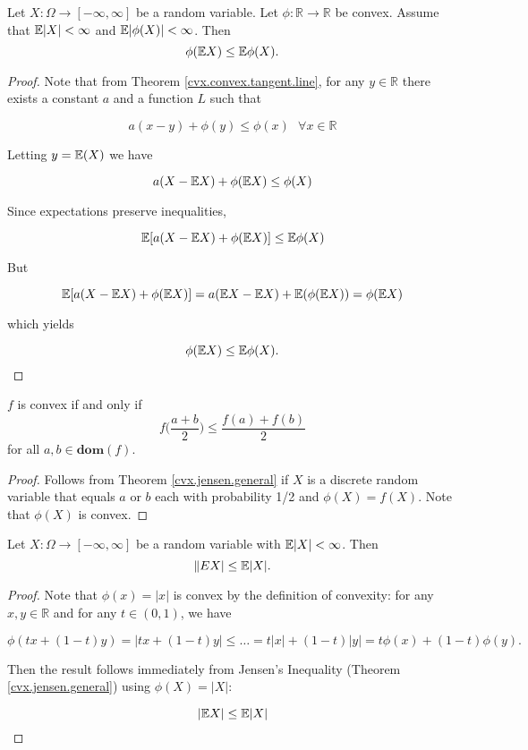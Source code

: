 \begin{theorem}\label{cvx.jensen.general}Let $X:\Omega\to[-\infty,\infty]$ be a random variable.  Let $\phi:\mathbb{R}\to\mathbb{R}$ be convex.  Assume that $\mathbb{E}|X|<\infty$ and $\mathbb{E}|\phi(X)|<\infty$.  Then
$$\phi(\mathbb{E} X)\leq \mathbb{E} \phi(X).$$
\end{theorem}

\begin{proof}Note that from Theorem \ref{cvx.convex.tangent.line}, for any \(y \in \mathbb{R}\) there exists a constant \(a\) and a function \(L\) such that

\[
a(x-y)+\phi(y) \leq \phi(x) \ \ \ \forall x \in \mathbb{R}
\]

Letting \(y = \mathbb{E}(X)\) we have

\[
a (X-\mathbb{E} X)+\phi(\mathbb{E} X) \leq \phi(X)
\]

Since expectations preserve inequalities,

\[
\mathbb{E}[a (X-\mathbb{E} X)+\phi(\mathbb{E} X)] \leq \mathbb{E} \phi(X)
\]

But

\[
\mathbb{E}[a(X-\mathbb{E} X)+\phi(\mathbb{E} X)]  = a(\mathbb{E} X - \mathbb{E} X) + \mathbb{E}(\phi(\mathbb{E} X)) = \phi(\mathbb{E} X)
\]

which yields

\[
\phi( \mathbb{E} X) \leq \mathbb{E} \phi(X).
\]

\end{proof}

\begin{corollary}\label{cvx.jensen} \(f\) is convex if and only if
\[
f \bigg(\frac{a+b}{2} \bigg) \leq \frac{f(a) + f(b)}{2} 
\]
for all \(a, b \in \textbf{dom}(f)\). 
\end{corollary}

\begin{proof} Follows from Theorem \ref{cvx.jensen.general} if \(X\) is a discrete random variable that equals \(a\) or \(b\) each with probability 1/2 and \(\phi(X) = f(X)\). Note that \(\phi(X)\) is convex.

\end{proof}

\begin{corollary} Let $X:\Omega\to[-\infty,\infty]$ be a random variable with $\mathbb{E}|X|<\infty$. Then
$$\|E X|\leq\mathbb{E}|X|.$$

\end{corollary}

\begin{proof}Note that \(\phi(x) = |x|\) is convex by the definition of convexity: for any \(x, y \in \mathbb{R}\) and for any \(t \in (0, 1)\), we have

\[
\phi(tx+(1-t)y) = |tx + (1-t)y| \leq \ldots =  t|x|+(1-t)|y| =  t\phi(x)+(1-t)\phi(y).
\]

Then the result follows immediately from Jensen's Inequality (Theorem \ref{cvx.jensen.general}) using \(\phi(X) = |X|\):

\[
|\mathbb{E} X| \leq \mathbb{E} |X|
\]

\end{proof}

